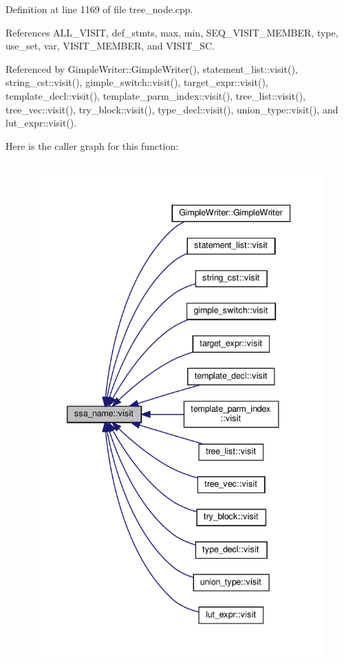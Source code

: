 Definition at line 1169 of file tree\+\_\+node.\+cpp.



References A\+L\+L\+\_\+\+V\+I\+S\+IT, def\+\_\+stmts, max, min, S\+E\+Q\+\_\+\+V\+I\+S\+I\+T\+\_\+\+M\+E\+M\+B\+ER, type, use\+\_\+set, var, V\+I\+S\+I\+T\+\_\+\+M\+E\+M\+B\+ER, and V\+I\+S\+I\+T\+\_\+\+SC.



Referenced by Gimple\+Writer\+::\+Gimple\+Writer(), statement\+\_\+list\+::visit(), string\+\_\+cst\+::visit(), gimple\+\_\+switch\+::visit(), target\+\_\+expr\+::visit(), template\+\_\+decl\+::visit(), template\+\_\+parm\+\_\+index\+::visit(), tree\+\_\+list\+::visit(), tree\+\_\+vec\+::visit(), try\+\_\+block\+::visit(), type\+\_\+decl\+::visit(), union\+\_\+type\+::visit(), and lut\+\_\+expr\+::visit().

Here is the caller graph for this function\+:
\nopagebreak
\begin{figure}[H]
\begin{center}
\leavevmode
\includegraphics[height=550pt]{db/d2f/structssa__name_a9dd9ab89f7b91f1698c66869146a89dd_icgraph}
\end{center}
\end{figure}


